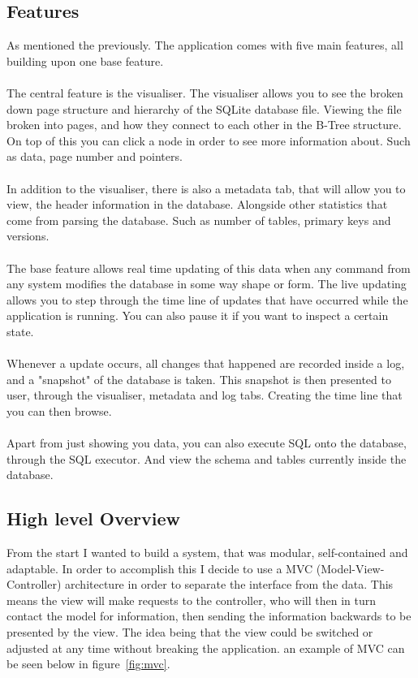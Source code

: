 \subsection{Features}
\label{subsec:Features}
As mentioned the previously. The application comes with five main features, all building upon one base feature.
\\\\
The central feature is the visualiser. The visualiser allows you to see the broken down page structure and hierarchy of the SQLite database file. Viewing the file broken into pages, and how they connect to each other in the B-Tree structure. On top of this you can click a node in order to see more information about. Such as data, page number and pointers.
\\\\
In addition to the visualiser, there is also a metadata tab, that will allow you to view, the header information in the database. Alongside other statistics that come from parsing the database. Such as number of tables, primary keys and versions.
\\\\
The base feature allows real time updating of this data when any command from any system modifies the database in some way shape or form. The live updating allows you to step through the time line of updates that have occurred while the application is running. You can also pause it if you want to inspect a certain state. 
\\\\
Whenever a update occurs, all changes that happened are recorded inside a log, and a "snapshot" of the database is taken. This snapshot is then presented to user, through the visualiser, metadata and log tabs. Creating the time line that you can then browse. 
\\\\
Apart from just showing you data, you can also execute SQL onto the database, through the SQL executor. And view the schema and tables currently inside the database. 

\subsection{High level Overview}
\label{subsec:high_level_overview}

From the start I wanted to build a system, that was modular, self-contained and adaptable. In order to accomplish this I decide to use a MVC (Model-View-Controller) architecture in order to separate the interface from the data. This means the view will make requests to the controller, who will then in turn contact the model for information, then sending the information backwards to be presented by the view. The idea being that the view could be switched or adjusted at any time without breaking the application. an example of MVC can be seen below in figure~\ref{fig:mvc}.

